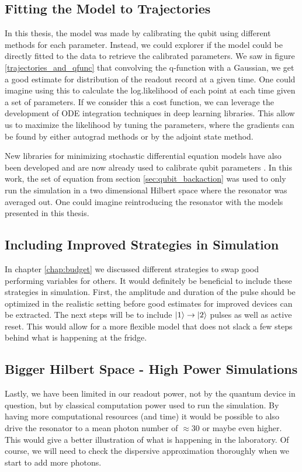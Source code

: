 \subsection{Fitting the Model to Trajectories}
In this thesis, the model was made by calibrating the qubit using different methods for each parameter. Instead, we could explorer if the model could be directly fitted to the data to retrieve the calibrated parameters. We saw in figure \ref{trajectories_and_qfunc} that convolving the q-function with a Gaussian, we get a good estimate for distribution of the readout record at a given time. One could imagine using this to calculate the log.likelihood of each point at each time given a set of parameters. If we consider this a cost function, we can leverage the development of ODE integration techniques in deep learning libraries. This allow us to maximize the likelihood by tuning the parameters, where the gradients can be found by either autograd methods or by the adjoint state method. \cite{allaire}

New libraries for minimizing stochastic differential equation models have also been developed and are now already used to calibrate qubit parameters \cite{genois_quantum-tailored_2021}. In this work, the set of equation from section \ref{sec:qubit_backaction} was used to only run the simulation in a two dimensional Hilbert space where the resonator was averaged out. One could imagine reintroducing the resonator with the models presented in this thesis.


\subsection{Including Improved Strategies in Simulation} 
In chapter \ref{chap:budget} we discussed different strategies to swap good performing variables for others. It would definitely be beneficial to include these strategies in simulation. First, the amplitude and duration of the pulse should be optimized in the realistic setting before good estimates for improved devices can be extracted. The next steps will be to include $\ket{1}\to\ket{2}$ pulses as well as active reset. This would allow for a more flexible model that does not slack a few steps behind what is happening at the fridge. 

\subsection{Bigger Hilbert Space - High Power Simulations}
Lastly, we have been limited in our readout power, not by the quantum device in question, but by classical computation power used to run the simulation. By having more computational resources (and time) it would be possible to also drive the resonator to a mean photon number of $\approx30$ or maybe even higher. This would give a better illustration of what is happening in the laboratory. Of course, we will need to check the dispersive approximation thoroughly when we start to add more photons.   